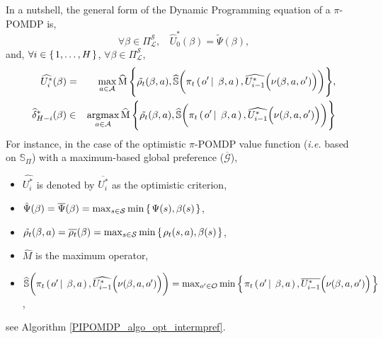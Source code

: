 In a nutshell, the general form of the Dynamic Programming equation of a $\pi$-POMDP is,
\[ \forall \beta \in \Pi^{\mathcal{S}}_{\mathcal{L}}, \ \ \ \ \widehat{U}^*_0(\beta) = \tilde{\Psi}(\beta),\]
and, $\forall i \in \left\{ \left. 1,\ldots,H \right. \right\}$, $\forall \beta \in \Pi^{\mathcal{S}}_{\mathcal{L}}$,
\begin{eqnarray}
\label{general_DP_piPOMDP} \widehat{U^*_{i}}(\beta) &=& \max_{a \in \mathcal{A}} \operatorname*{\widehat{M}} \Bigg\{ \tilde{\rho_t}(\beta,a), \widehat{\mathbb{S}}\bigg( \pi_t \left( \left. o' \, \right| \left. \, \beta, a \right. \right), \widehat{U^*_{i-1}} \Big( \nu( \beta,a,o') \Big) \bigg) \Bigg\},\\
\label{general_DP_piPOMDP_actSelec} \widehat{\delta}_{H-i}^*(\beta) &\in& \operatorname*{argmax}_{a \in \mathcal{A}} \operatorname*{\widehat{M}} \Bigg\{  \tilde{\rho_t}(\beta,a), \widehat{\mathbb{S}}\bigg( \pi_t \left( \left. o' \, \right| \left. \, \beta, a \right. \right), \widehat{U^*_{i-1}} \Big( \nu( \beta,a,o') \Big) \bigg) \Bigg\} 
\end{eqnarray}
For instance, in the case of the optimistic $\pi$-POMDP value function 
(\textit{i.e.} based on $\mathbb{S}_{\Pi}$) 
with a maximum-based global preference ($\overline{\mathcal{G}}$),
\begin{itemize}
\item $\widehat{U^*_{i}}$ is denoted by $\overline{U^*_i}$ as the optimistic criterion,
\item $\tilde{\Psi}(\beta) = \overline{\Psi}(\beta) = \max_{s \in \mathcal{S}} \min \left\{ \left.  \Psi(s), \beta(s)   \right. \right\}$,
\item $\tilde{\rho_t}(\beta,a) = \overline{\rho_t}(\beta) = \max_{s \in \mathcal{S}} \min \left\{ \left.  \rho_t(s,a), \beta(s)   \right. \right\}$,
\item $\widehat{M}$ is the maximum operator,
\item $\widehat{\mathbb{S}}\bigg( \pi_t \left( \left. o' \, \right| \left. \, \beta, a \right. \right), \widehat{U^*_{i-1}} \Big( \nu( \beta,a,o') \Big) \bigg) = \max_{o' \in \mathcal{O}} \min \left\{ \left.  \pi_t \left( \left.  o' \, \right| \left. \, \beta,a  \right. \right), \overline{U^*_{i-1}}\Big( \nu( \beta,a,o') \Big)   \right. \right\}$,
\end{itemize}
see Algorithm \ref{PIPOMDP_algo_opt_intermpref}.

